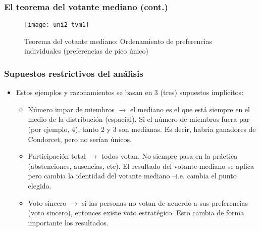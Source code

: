 \documentclass[14pt,aspectratio=169]{beamer}
\begin{document}
\begin{frame}
\frametitle{El teorema del votante mediano (cont.)}

\begin{figure}[htbp]\vspace{-0.3cm}
  \centering
  \texttt{[image: uni2\_tvm1]}
  \caption{Teorema del votante mediano: Ordenamiento de preferencias
    individuales (preferencias de pico único)}
  \label{fig:3}
\end{figure}
\end{frame}


\begin{frame}\frametitle{Supuestos restrictivos del análisis}
\begin{itemize}
\item Estos ejemplos y razonamientos se basan en 3 (tres) supuestos
  implícitos:
\begin{itemize}\itemsep 5pt \medskip
\item Número impar de miembros $\longrightarrow$ el mediano es el que
  está siempre en el medio de la distribución (espacial). Si el número
  de miembros fuera par (por ejemplo, 4), tanto 2 y 3 son medianas. Es
  decir, habria ganadores de Condorcet, pero no serían únicos.
\item Participación total $\longrightarrow$ todos votan. No siempre
  pasa en la práctica (abstenciones, ausencias, etc). El resultado del
  votante mediano se aplica pero cambia la identidad del votante
  mediano --i.e. cambia el punto elegido.
\item Voto sincero $\longrightarrow$ si las personas no votan de
  acuerdo a sus preferencias (voto sincero), entonces existe voto
  estratégico. Esto cambia de forma importante los resultados.
\end{itemize}
\end{itemize}
\end{frame}
\end{document}
